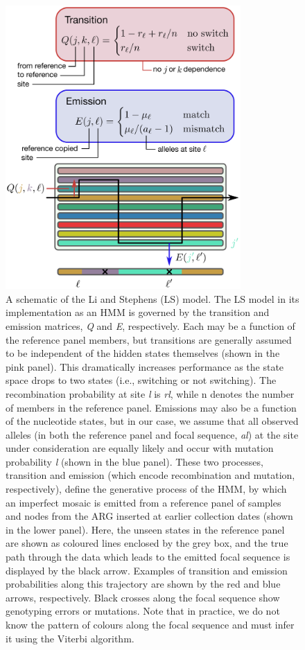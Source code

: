 \documentclass{article}
\begin{document}
\begin{figure}
\centering
\includegraphics[width=0.8\textwidth]{figures/ls_diagram_covid.pdf}
\caption{\label{fig:ls_diagram} A schematic of the Li and Stephens (LS) model. The LS model in its implementation as an HMM is governed by the transition and emission matrices, \textit{Q} and \textit{E}, respectively. Each may be a function of the reference panel members, but transitions are generally assumed to be independent of the hidden states themselves (shown in the pink panel). This dramatically increases performance as the state space drops to two states (i.e., switching or not switching). The recombination probability at site \textit{l} is \textit{rl}, while n denotes the number of members in the reference panel. Emissions may also be a function of the nucleotide states, but in our case, we assume that all observed alleles (in both the reference panel and focal sequence, \textit{al}) at the site under consideration are equally likely and occur with mutation probability \textit{l} (shown in the blue panel). These two processes, transition and emission (which encode recombination and mutation, respectively), define the generative process of the HMM, by which an imperfect mosaic is emitted from a reference panel of samples and nodes from the ARG inserted at earlier collection dates (shown in the lower panel). Here, the unseen states in the reference panel are shown as coloured lines enclosed by the grey box, and the true path through the data which leads to the emitted focal sequence is displayed by the black arrow. Examples of transition and emission probabilities along this trajectory are shown by the red and blue arrows, respectively. Black crosses along the focal sequence show genotyping errors or mutations. Note that in practice, we do not know the pattern of colours along the focal sequence and must infer it using the Viterbi algorithm.}
\end{figure}
\end{document}

